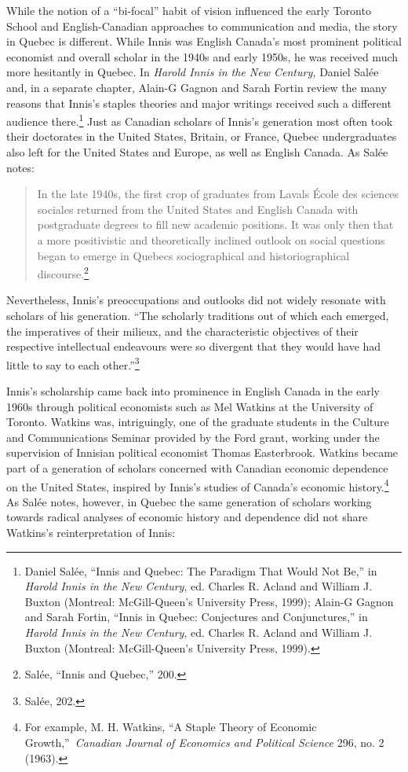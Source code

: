\documentclass{tufte-handout}
\begin{document}
While the notion of a ``bi-focal'' habit of vision influenced the early
Toronto School and English-Canadian approaches to communication and
media, the story in Quebec is different. While Innis was English
Canada's most prominent political economist and overall scholar in the
1940s and early 1950s, he was received much more hesitantly in Quebec.
In \emph{Harold Innis in the New Century,} Daniel Salée and, in a
separate chapter, Alain-G Gagnon and Sarah Fortin review the many
reasons that Innis's staples theories and major writings received such a
different audience there.\footnote{Daniel Salée, ``Innis and Quebec: The
  Paradigm That Would Not Be,'' in \emph{Harold Innis in the New
  Century}, ed. Charles R. Acland and William J. Buxton (Montreal:
  McGill-Queen's University Press, 1999); Alain-G Gagnon and Sarah
  Fortin, ``Innis in Quebec: Conjectures and Conjunctures,'' in
  \emph{Harold Innis in the New Century}, ed. Charles R. Acland and
  William J. Buxton (Montreal: McGill-Queen's University Press, 1999).}
Just as Canadian scholars of Innis's generation most often took their
doctorates in the United States, Britain, or France, Quebec
undergraduates also left for the United States and Europe, as well as
English Canada. As Salée notes:

\begin{quote}
In the late 1940s, the first crop of graduates from
Laval\textquotesingle s École des sciences sociales returned from the
United States and English Canada with postgraduate degrees to fill new
academic positions. It was only then that a more positivistic and
theoretically inclined outlook on social questions began to emerge in
Quebec\textquotesingle s sociographical and historiographical
discourse.\footnote{Salée, ``Innis and Quebec,'' 200.}
\end{quote}



\noindent Nevertheless, Innis's preoccupations and outlooks did not widely
resonate with scholars of his generation. ``The scholarly traditions out
of which each emerged, the imperatives of their milieux, and the
characteristic objectives of their respective intellectual endeavours
were so divergent that they would have had little to say to each
other.''\footnote{Salée, 202.}


Innis's scholarship came back into prominence in English Canada in the
early 1960s through political economists such as Mel Watkins at the
University of Toronto. Watkins was, intriguingly, one of the graduate
students in the Culture and Communications Seminar provided by the Ford
grant, working under the supervision of Innisian political economist
Thomas Easterbrook. Watkins became part of a generation of scholars
concerned with Canadian economic dependence on the United States,
inspired by Innis's studies of Canada's economic history.\footnote{For
  example, M. H. Watkins, ``A Staple Theory of Economic
  Growth,''~\emph{Canadian Journal of Economics and Political Science}
  296, no. 2 (1963).} As Salée notes, however, in Quebec the same
generation of scholars working towards radical analyses of economic\newpage\noindent
history and dependence did not share Watkins's reinterpretation of
Innis:
\end{document}
